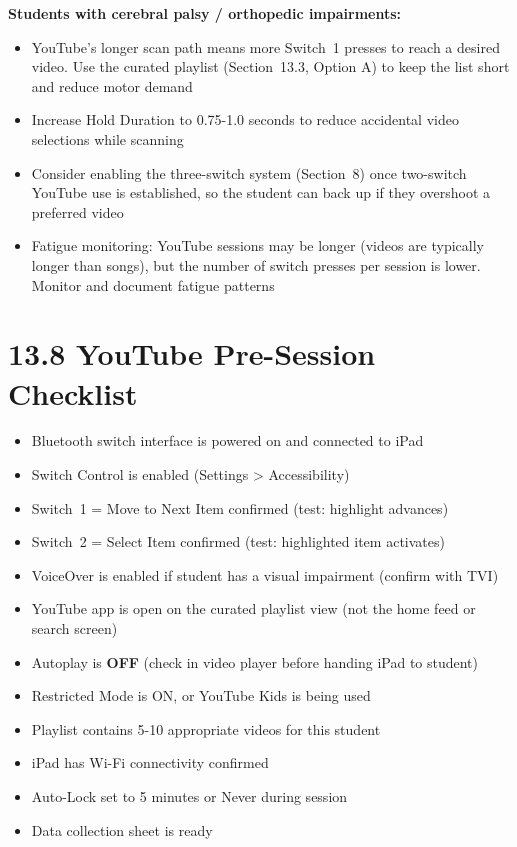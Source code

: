 \documentclass[justified,openright]{tufte-book}
\DeclareRobustCommand{\checkbox}{\(\square\)}
\begin{document}

\textbf{Students with cerebral palsy / orthopedic impairments:}
\begin{itemize}

\item
  YouTube's longer scan path means more Switch~1 presses to reach a
  desired video. Use the curated playlist (Section~13.3, Option A)
  to keep the list short and reduce motor demand
\item
  Increase Hold Duration to 0.75-1.0 seconds to reduce accidental
  video selections while scanning
\item
  Consider enabling the three-switch system (Section~8) once
  two-switch YouTube use is established, so the student can back up
  if they overshoot a preferred video
\item
  Fatigue monitoring: YouTube sessions may be longer (videos are
  typically longer than songs), but the number of switch presses per
  session is lower. Monitor and document fatigue patterns
\end{itemize}

\section{13.8 YouTube Pre-Session
Checklist}\label{youtube-pre-session-checklist}

\begin{itemize}

\item[\checkbox] 
Bluetooth switch interface is powered on and connected to iPad
\item[\checkbox] 
Switch Control is enabled (Settings \textgreater{} Accessibility)
\item[\checkbox] 
Switch~1 = Move to Next Item confirmed (test: highlight advances)
\item[\checkbox] 
Switch~2 = Select Item confirmed (test: highlighted item activates)
\item[\checkbox] 
VoiceOver is enabled if student has a visual impairment (confirm
  with TVI)
\item[\checkbox] 
YouTube app is open on the curated playlist view (not the home
  feed or search screen)
\item[\checkbox] 
Autoplay is \textbf{OFF} (check in video player before handing
  iPad to student)
\item[\checkbox] 
Restricted Mode is ON, or YouTube Kids is being used
\item[\checkbox] 
Playlist contains 5-10 appropriate videos for this student
\item[\checkbox] 
iPad has Wi-Fi connectivity confirmed
\item[\checkbox] 
Auto-Lock set to 5 minutes or Never during session
\item[\checkbox] 
Data collection sheet is ready
\end{itemize}
\end{document}
